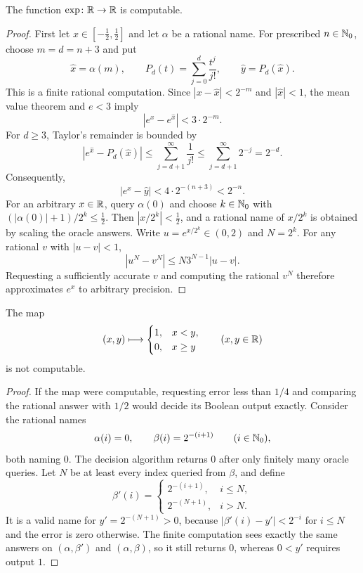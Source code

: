 \begin{theorem}\label{thm:exp}
The function $\exp\colon\mathbb{R}\to\mathbb{R}$ is computable.
\end{theorem}
\begin{proof}
First let $x\in[-\tfrac12, \tfrac12]$ and let $\alpha$ be a
rational name. For prescribed $n\in\mathbb{N}_0$, choose $m=d=n+3$ and put
\[
 \widehat{x}=\alpha(m), \qquad
 P_d(t)=\sum_{j=0}^{d}\frac{t^j}{j!}, \qquad
 \widehat{y}=P_d(\widehat{x}).
\]
This is a finite rational computation. Since
$|x-\widehat{x}|<2^{-m}$ and $|\widehat{x}|<1$, the mean value
theorem and $e<3$ imply
\[
 |e^x-e^{\widehat{x}}|<3\cdot2^{-m}.
\]
For $d\ge3$, Taylor's remainder is bounded by
\[
 |e^{\widehat{x}}-P_d(\widehat{x})|
 \le\sum_{j=d+1}^{\infty}\frac1{j!}
 \le\sum_{j=d+1}^{\infty}2^{-j}=2^{-d}.
\]
Consequently,
\[
 |e^x-\widehat{y}|<4\cdot2^{-(n+3)}<2^{-n}.
\]
For an arbitrary $x\in\mathbb{R}$, query $\alpha(0)$ and choose
$k\in\mathbb{N}_0$ with $(|\alpha(0)|+1)/2^k\le\tfrac12$.
Then $|x/2^k|<\tfrac12$, and a rational name of $x/2^k$ is
obtained by scaling the oracle answers. Write
$u=e^{x/2^k}\in(0, 2)$ and $N=2^k$. For any rational $v$ with
$|u-v|<1$,
\[
 |u^N-v^N|\le N3^{N-1}|u-v|.
\]
Requesting a sufficiently accurate $v$ and computing the rational
$v^N$ therefore approximates $e^x$ to arbitrary precision.
\end{proof}

\begin{theorem}
The map
\[
 (x, y)\longmapsto
 \begin{cases}1, &x<y, \\0, &x\ge y\end{cases}
 \qquad (x, y\in\mathbb{R})
\]
is not computable.
\end{theorem}
\begin{proof}
If the map were computable, requesting error less than $1/4$ and
comparing the rational answer with $1/2$ would decide its Boolean
output exactly. Consider the rational names
\[
 \alpha(i)=0, \qquad \beta(i)=2^{-(i+1)}
 \qquad(i\in\mathbb{N}_0),
\]
both naming $0$. The decision algorithm returns $0$ after
only finitely many oracle queries. Let $N$ be at least every
index queried from $\beta$, and define
\[
 \beta'(i)=
 \begin{cases}
 2^{-(i+1)}, &i\le N, \\
 2^{-(N+1)}, &i>N.
 \end{cases}
\]
It is a valid name for $y'=2^{-(N+1)}>0$, because
$|\beta'(i)-y'|<2^{-i}$ for $i\le N$ and the error is zero
otherwise. The finite computation sees exactly the same answers
on $(\alpha, \beta')$ and $(\alpha, \beta)$, so it still returns
$0$, whereas $0<y'$ requires output $1$.
\end{proof}


